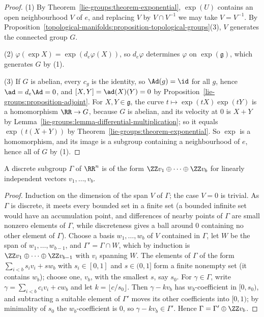 \begin{proof}
(1) By Theorem~\ref{lie-groups:theorem-exponential}, $\exp(U)$ contains an open neighbourhood $V$ of $e$, and replacing $V$ by $V \cap V^{-1}$ we may take
$V = V^{-1}$. By Proposition~\ref{topological-manifolds:proposition-topological-groups}(3), $V$ generates the connected group $G$.

(2) $\varphi(\exp X) = \exp(d_e\varphi(X))$, so $d_e\varphi$ determines $\varphi$ on $\exp(\mathfrak{g})$, which generates $G$ by (1).

(3) If $G$ is abelian, every $c_g$ is the identity, so $\Ad(g) = \id$ for all $g$, hence $\ad = d_e\Ad = 0$, and $[X, Y] = \ad(X)(Y) = 0$ by
Proposition~\ref{lie-groups:proposition-adjoint}. For $X, Y \in \mathfrak{g}$, the curve $t \mapsto \exp(tX)\exp(tY)$ is a homomorphism $\RR \to G$, because $G$ is
abelian, and its velocity at $0$ is $X + Y$ by Lemma~\ref{lie-groups:lemma-differential-multiplication}; so it equals $\exp(t(X + Y))$ by
Theorem~\ref{lie-groups:theorem-exponential}. So $\exp$ is a homomorphism, and its image is a subgroup containing a neighbourhood of $e$, hence all of $G$ by (1).
\end{proof}

\begin{lemma}\label{lie-groups:lemma-discrete-subgroups}
A discrete subgroup $\Gamma$ of $\RR^n$ is of the form $\ZZ v_1 \oplus \cdots \oplus \ZZ v_b$ for linearly independent vectors $v_1, \ldots, v_b$.
\end{lemma}

\begin{proof}
Induction on the dimension of the span $V$ of $\Gamma$; the case $V = 0$ is trivial. As $\Gamma$ is discrete, it meets every bounded set in a finite set (a bounded infinite set would have an accumulation point, and differences of
nearby points of $\Gamma$ are small nonzero elements of $\Gamma$, while discreteness gives a ball around $0$ containing no other element of $\Gamma$). Choose a basis $w_1, \ldots, w_b$ of $V$ contained in $\Gamma$, let $W$ be the span of
$w_1, \ldots, w_{b-1}$, and $\Gamma' = \Gamma \cap W$, which by induction is $\ZZ v_1 \oplus \cdots \oplus \ZZ v_{b-1}$ with $v_i$ spanning $W$. The elements of $\Gamma$ of the form $\sum_{i<b}s_iv_i + sw_b$ with $s_i \in [0, 1]$ and
$s \in (0, 1]$ form a finite nonempty set (it contains $w_b$); choose one, $v_b$, with the smallest $s$, say $s_0$. For $\gamma \in \Gamma$, write $\gamma = \sum_{i<b}c_iv_i + cw_b$ and let $k = \lfloor c/s_0\rfloor$. Then $\gamma - kv_b$ has
$w_b$-coefficient in $[0, s_0)$, and subtracting a suitable element of $\Gamma'$ moves its other coefficients into $[0, 1)$; by minimality of $s_0$ the $w_b$-coefficient is $0$, so $\gamma - kv_b \in \Gamma'$. Hence
$\Gamma = \Gamma' \oplus \ZZ v_b$.
\end{proof}

